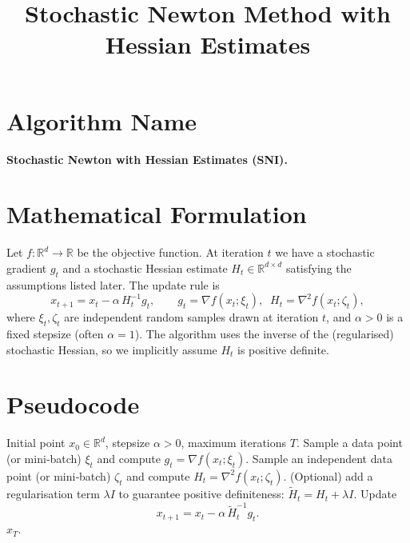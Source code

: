 \documentclass{article}
\begin{document}
\title{Stochastic Newton Method with Hessian Estimates}
\author{}
\date{}
\maketitle

\section*{Algorithm Name}
\textbf{Stochastic Newton with Hessian Estimates (SNI).}
\section*{Mathematical Formulation}
Let $f:\mathbb{R}^{d}\rightarrow\mathbb{R}$ be the objective function.  
At iteration $t$ we have a stochastic gradient $g_{t}$ and a stochastic
Hessian estimate $H_{t}\in\mathbb{R}^{d\times d}$ satisfying the
assumptions listed later.  The update rule is
\[
x_{t+1}=x_{t}-\alpha\,H_{t}^{-1}g_{t},
\qquad
g_{t}= \nabla f(x_{t};\xi_{t}),\;\;
H_{t}= \nabla^{2}f(x_{t};\zeta_{t}),
\]
where $\xi_{t},\zeta_{t}$ are independent random samples drawn at
iteration $t$, and $\alpha>0$ is a fixed stepsize (often $\alpha=1$).
The algorithm uses the inverse of the (regularised) stochastic Hessian,
so we implicitly assume $H_{t}$ is positive definite.

\section*{Pseudocode}
\begin{algorithm}[H]
\caption{Stochastic Newton with Hessian Estimates}
\begin{algorithmic}[1]
\REQUIRE Initial point $x_{0}\in\mathbb{R}^{d}$, stepsize $\alpha>0$,
        maximum iterations $T$.
    \STATE Sample a data point (or mini‑batch) $\xi_{t}$ and compute
          $g_{t}= \nabla f(x_{t};\xi_{t})$.
    \STATE Sample an independent data point (or mini‑batch) $\zeta_{t}$ and compute
          $H_{t}= \nabla^{2} f(x_{t};\zeta_{t})$.
    \STATE (Optional) add a regularisation term $\lambda I$ to guarantee
          positive definiteness:
          $ \tilde H_{t}= H_{t}+ \lambda I$.
    \STATE Update
          \[
          x_{t+1}=x_{t}-\alpha\,\tilde H_{t}^{-1} g_{t}.
          \]
\ENDFOR
\RETURN $x_{T}$.
\end{algorithmic}
\end{algorithm}
\end{document}
